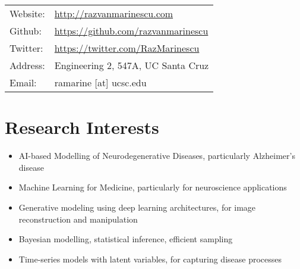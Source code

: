 \documentclass[a4paper,10pt]{article} %
\begin{document}
\pagestyle{empty} %



\par{\bigskip\par}

\begin{tabular}{ll}
 Website: & \url{http://razvanmarinescu.com}\\
 Github: & \url{https://github.com/razvanmarinescu}\\
 Twitter: & \url{https://twitter.com/RazMarinescu}\\
 Address: & Engineering 2, 547A, UC Santa Cruz\\
 Email: & ramarine [at] ucsc.edu\\

\end{tabular}



\vspace{-0.5em}
\section*{Research Interests}
\begin{itemize}
\itemsep0em 
\item AI-based Modelling of Neurodegenerative Diseases, particularly Alzheimer's disease
\item Machine Learning for Medicine, particularly for neuroscience applications
\item Generative modeling using deep learning architectures, for image reconstruction and manipulation
\item Bayesian modelling, statistical inference, efficient sampling
\item Time-series models with latent variables, for capturing disease processes
\end{itemize}
\end{document}
